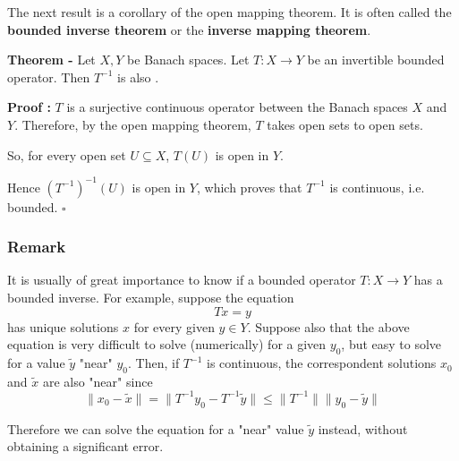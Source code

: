 \documentclass[12pt]{article}
\begin{document}

The next result is a corollary of the open mapping theorem. It is often called the {\bf bounded inverse theorem} or the {\bf inverse mapping theorem}.

{\bf Theorem -} Let $X, Y$ be Banach spaces. Let $T: X \longrightarrow Y$ be an invertible bounded operator. Then $T^{-1}$ is also .

{\bf Proof :} $T$ is a surjective continuous operator between the Banach spaces $X$ and $Y$. Therefore, by the open mapping theorem, $T$ takes open sets to open sets.

So, for every open set $U \subseteq X$, $T(U)$ is open in $Y$.

Hence $(T^{-1})^{-1}(U)$ is open in $Y$, which proves that $T^{-1}$ is continuous, i.e. bounded. $\square$

\subsubsection{Remark}

It is usually of great importance to know if a bounded operator $T:X\longrightarrow Y$ has a bounded inverse. For example, suppose the equation
\begin{displaymath}
Tx=y
\end{displaymath}
has unique solutions $x$ for every given $y \in Y$. Suppose also that the above equation is very difficult to solve (numerically) for a given $y_0$, but easy to solve for a value $\tilde{y}$ "near" $y_0$. Then, if $T^{-1}$ is continuous,  the correspondent solutions $x_0$ and $\tilde{x}$ are also "near" since
\begin{displaymath}
\|x_0 - \tilde{x}\| = \|T^{-1}y_0 - T^{-1}\tilde{y}\| \leq \|T^{-1}\|\|y_0-\tilde{y}\|
\end{displaymath}

Therefore we can solve the equation for a "near" value $\tilde{y}$ instead, without obtaining a significant error.
\end{document}
